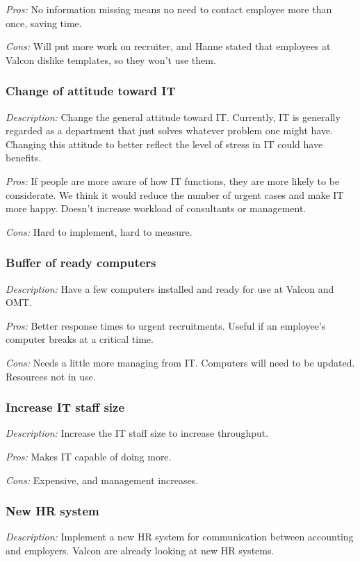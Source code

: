 \noindent \emph{Pros:} No information missing means no need to contact employee more than once, saving time.

\noindent \emph{Cons:} Will put more work on recruiter, and Hanne stated that employees at Valcon dislike templates, so they won't use them.

\subsubsection{Change of attitude toward IT}
\emph{Description:} Change the general attitude toward IT. Currently, IT is generally regarded as a department that just solves whatever problem one might have. Changing this attitude to better reflect the level of stress in IT could have benefits.

\noindent \emph{Pros:} If people are more aware of how IT functions, they are more likely to be considerate. We think it would reduce the number of urgent cases and make IT more happy. Doesn't increase workload of consultants or management.

\noindent \emph{Cons:} Hard to implement, hard to measure.

\subsubsection{Buffer of ready computers}
\emph{Description:} Have a few computers installed and ready for use at Valcon and OMT.

\noindent \emph{Pros:} Better response times to urgent recruitments. Useful if an employee's computer breaks at a critical time.

\noindent \emph{Cons:} Needs a little more managing from IT. Computers will need to be updated. Resources not in use.

\subsubsection{Increase IT staff size}
\emph{Description:} Increase the IT staff size to increase throughput.

\noindent \emph{Pros:} Makes IT capable of doing more.

\noindent \emph{Cons:} Expensive, and management increases.

\subsubsection{New HR system}
\emph{Description:} Implement a new HR system for communication between accounting and employers.
Valcon are already looking at new HR systems.

